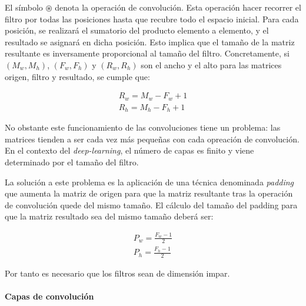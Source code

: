 El símbolo $\circledast$ denota la operación de convolución. Esta operación hacer recorrer el filtro por todas las posiciones hasta que recubre todo el espacio inicial. Para cada posición, se realizará el sumatorio del producto elemento a elemento, y el resultado se asignará en dicha posición. Esto implica que el tamaño de la matriz resultante es inversamente proporcional al tamaño del filtro. Concretamente, si $(M_w, M_h)$, $(F_w, F_h)$ y $(R_w, R_h)$ son el ancho y el alto para las matrices origen, filtro y resultado, se cumple que:

\begin{align}
	R_w = M_w - F_w + 1 \\
	R_h = M_h - F_h + 1
	\label{eq:convolve-result-sizes-basic}
\end{align}

No obstante este funcionamiento de las convoluciones tiene un problema: las matrices tienden a ser cada vez más pequeñas con cada opreación de convolución. En el contexto del \textit{deep-learning}, el número de capas es finito y viene determinado por el tamaño del filtro.

La solución a este problema es la aplicación de una técnica denominada \textit{padding} que aumenta la matriz de origen para que la matriz resultante tras la operación de convolución quede del mismo tamaño. El cálculo del tamaño del padding para que la matriz resultado sea del mismo tamaño deberá ser:

\begin{align}
	P_w = \frac{F_w - 1}{2} \\
	P_h = \frac{F_h - 1}{2} 
	\label{eq:convolve-filter-padding-dims}
\end{align}

Por tanto es necesario que los filtros sean de dimensión impar.

\paragraph{Capas de convolución}

